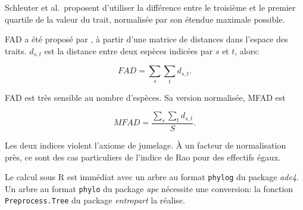 \documentclass[
  11pt,
  french,
  a4paper,
  extrafontsizes,onecolumn,openright
  ]{memoir}
\newenvironment{Shaded}{\begin{snugshade}}{\end{snugshade}}
\newcommand{\CommentTok}[1]{\textcolor[rgb]{0.56,0.35,0.01}{\textit{#1}}}
\newcommand{\DecValTok}[1]{\textcolor[rgb]{0.00,0.00,0.81}{#1}}
\newcommand{\KeywordTok}[1]{\textcolor[rgb]{0.13,0.29,0.53}{\textbf{#1}}}
\newcommand{\NormalTok}[1]{#1}
\newcommand{\OperatorTok}[1]{\textcolor[rgb]{0.81,0.36,0.00}{\textbf{#1}}}
\newcommand{\StringTok}[1]{\textcolor[rgb]{0.31,0.60,0.02}{#1}}
\begin{document}
Schleuter et al.~proposent d'utiliser la différence entre le troisième et le premier quartile de la valeur du trait, normalisée par son étendue maximale possible.

FAD a été proposé par \textcite{Walker1999}, à partir d'une matrice de distances dans l'espace des traits.
\(d_{s,t}\) est la distance entre deux espèces indicées par \(s\) et \(t\), alors:

\begin{equation}
  \label{eq:FAD}
  \mathit{FAD}=\sum_s{\sum_t{d_{s,t}}}.
\end{equation}

FAD est très sensible au nombre d'espèces.
Sa version normalisée, MFAD \autocite{Schmera2009} est

\begin{equation}
  \label{eq:MFAD}
  \mathit{MFAD}=\frac{\sum_s{\sum_t{d_{s,t}}}}{S}.
\end{equation}

Les deux indices violent l'axiome de jumelage.
À un facteur de normalisation près, ce sont des cas particuliers de l'indice de Rao pour des effectifs égaux.

Le calcul sous R est immédiat avec un arbre au format \texttt{phylog} du package \emph{ade4}.
Un arbre au format \texttt{phylo} du package \emph{ape} nécessite une conversion: la fonction \texttt{Preprocess.Tree} du package \emph{entropart} la réalise.

\scriptsize

\begin{Shaded}
\end{Shaded}
\end{document}
